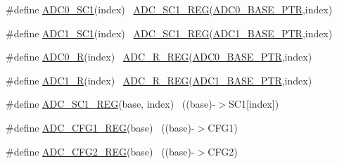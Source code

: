 \begin{DoxyCompactItemize}
\item 
\#define \hyperlink{group___a_d_c___register___accessor___macros_ga571d83134f9795ec51da08a99c3cba8b}{A\+D\+C0\+\_\+\+S\+C1}(index)                                                ~\hyperlink{group___a_d_c___register___accessor___macros_ga222b4f9dbc62d3e7cdc7fab81d736b1f}{A\+D\+C\+\_\+\+S\+C1\+\_\+\+R\+EG}(\hyperlink{group___a_d_c___peripheral_ga6cec2f227a3a37a9fccaa830740f1f5e}{A\+D\+C0\+\_\+\+B\+A\+S\+E\+\_\+\+P\+TR},index)
\item 
\#define \hyperlink{group___a_d_c___register___accessor___macros_ga60b62b4a213722b03db78e850f5d5894}{A\+D\+C1\+\_\+\+S\+C1}(index)                                                ~\hyperlink{group___a_d_c___register___accessor___macros_ga222b4f9dbc62d3e7cdc7fab81d736b1f}{A\+D\+C\+\_\+\+S\+C1\+\_\+\+R\+EG}(\hyperlink{group___a_d_c___peripheral_ga7fb56938ede79eea2065c4294db3b2d3}{A\+D\+C1\+\_\+\+B\+A\+S\+E\+\_\+\+P\+TR},index)
\item 
\#define \hyperlink{group___a_d_c___register___accessor___macros_gaa8fc1f5b1e0ab4d1105f4f5b85f50d61}{A\+D\+C0\+\_\+R}(index)                                                    ~\hyperlink{group___a_d_c___register___accessor___macros_gaa73e4be773e5276ec891d3ae1cfd7944}{A\+D\+C\+\_\+\+R\+\_\+\+R\+EG}(\hyperlink{group___a_d_c___peripheral_ga6cec2f227a3a37a9fccaa830740f1f5e}{A\+D\+C0\+\_\+\+B\+A\+S\+E\+\_\+\+P\+TR},index)
\item 
\#define \hyperlink{group___a_d_c___register___accessor___macros_ga4de64c34170dcafcbae5e713a9ca6903}{A\+D\+C1\+\_\+R}(index)                                                    ~\hyperlink{group___a_d_c___register___accessor___macros_gaa73e4be773e5276ec891d3ae1cfd7944}{A\+D\+C\+\_\+\+R\+\_\+\+R\+EG}(\hyperlink{group___a_d_c___peripheral_ga7fb56938ede79eea2065c4294db3b2d3}{A\+D\+C1\+\_\+\+B\+A\+S\+E\+\_\+\+P\+TR},index)
\item 
\#define \hyperlink{group___a_d_c___register___accessor___macros_ga222b4f9dbc62d3e7cdc7fab81d736b1f}{A\+D\+C\+\_\+\+S\+C1\+\_\+\+R\+EG}(base,  index)                                ~((base)-\/$>$S\+C1\mbox{[}index\mbox{]})
\item 
\#define \hyperlink{group___a_d_c___register___accessor___macros_ga1d379c53bd79f7568c89802f14ae147a}{A\+D\+C\+\_\+\+C\+F\+G1\+\_\+\+R\+EG}(base)                                          ~((base)-\/$>$C\+F\+G1)
\item 
\#define \hyperlink{group___a_d_c___register___accessor___macros_ga95c3a7cebd9170a6d22b0176e8167899}{A\+D\+C\+\_\+\+C\+F\+G2\+\_\+\+R\+EG}(base)                                          ~((base)-\/$>$C\+F\+G2)

\end{DoxyCompactItemize}
